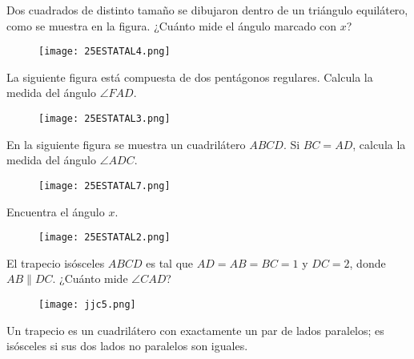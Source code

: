 \begin{problem}
    Dos cuadrados de distinto tamaño se dibujaron dentro de un 
    triángulo equilátero, como se muestra en la figura. ¿Cuánto 
    mide el ángulo marcado con $x$?
\end{problem}

\begin{figure}[h!]
    \centering
    \texttt{[image: 25ESTATAL4.png]}
\end{figure}

\begin{problem}
    La siguiente figura está compuesta de dos pentágonos 
    regulares. Calcula la medida del ángulo $\angle FAD$.
\end{problem}

\begin{figure}[h!]
    \centering
    \texttt{[image: 25ESTATAL3.png]}
\end{figure}

\begin{problem}
    En la siguiente figura se muestra un cuadrilátero $ABCD$. 
    Si $BC=AD$, calcula la medida del ángulo $\angle ADC$.
\end{problem}

\begin{figure}[!h]
    \centering
    \texttt{[image: 25ESTATAL7.png]}
\end{figure}

\begin{dproblem}
    Encuentra el ángulo $x$.    
\end{dproblem}

\begin{figure}[!h]
    \centering
    \texttt{[image: 25ESTATAL2.png]}
\end{figure}

\begin{problem}[$5 \clubsuit$]
    El trapecio isósceles $ABCD$ es tal que $AD = AB = BC = 1$ y 
    $DC = 2$, donde $AB \parallel DC$. ¿Cuánto mide $\angle CAD$?
\end{problem}

\begin{figure}[!h]
    \centering
    \texttt{[image: jjc5.png]}
\end{figure}

\begin{remark}
    Un trapecio es un cuadrilátero con exactamente un par de 
    lados paralelos; es isósceles si sus dos lados no paralelos 
    son iguales.
\end{remark}


